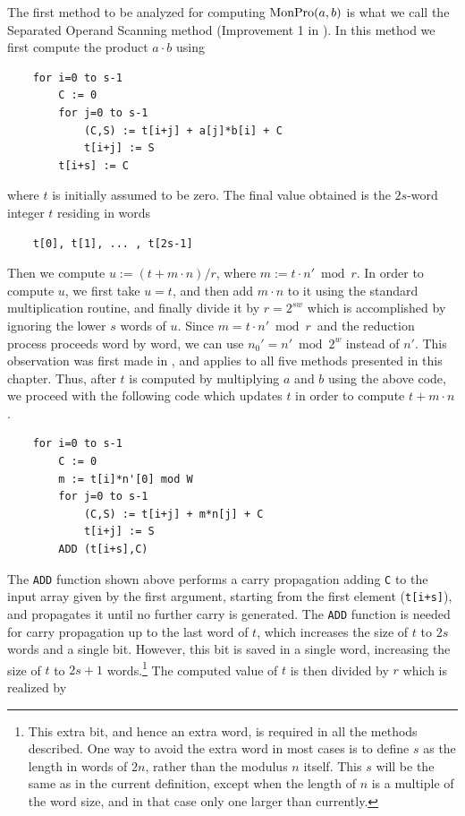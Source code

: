 \documentclass[twocolumn]{svjour3}          %
\begin{document}
The first method to be analyzed for computing $\mbox{MonPro}(a,b)$ is what we
call the Separated Operand Scanning method (Improvement 1 in
\cite{DK90:A}).  In this method we first compute the product $a \cdot
b$ using
%
\begin{verbatim}
    for i=0 to s-1
        C := 0
        for j=0 to s-1
            (C,S) := t[i+j] + a[j]*b[i] + C
            t[i+j] := S
        t[i+s] := C
\end{verbatim}
%
where $t$ is initially assumed to be zero.
The final value obtained is the $2s$-word integer $t$ residing
in words
%
\begin{verbatim}
    t[0], t[1], ... , t[2s-1]
\end{verbatim}
%
Then we compute $u:=(t+m \cdot n)/r$,
where $m:=t \cdot n' \bmod{r}$. In order to compute $u$, we
first take $u=t$, and then add $m \cdot n$ to it using the standard
multiplication routine, and finally divide it by $r=2^{sw}$ which is
accomplished by ignoring the lower $s$ words of $u$.
Since $m=t \cdot n' \bmod r\,$ and the reduction process proceeds word
by word, we can use $n_0'= n' \bmod{2^w}$ instead of $n'$. This
observation was first made in \cite{DK90:A}, and applies to all five
methods presented in this chapter.
Thus, after $t$ is computed by multiplying $a$ and $b$
using the above code, we proceed with the following code which
updates $t$ in order to compute $t+ m\cdot n$.
%
\begin{verbatim}
    for i=0 to s-1
        C := 0
        m := t[i]*n'[0] mod W
        for j=0 to s-1
            (C,S) := t[i+j] + m*n[j] + C
            t[i+j] := S
        ADD (t[i+s],C)
\end{verbatim}
%
The {\tt ADD} function shown above performs a carry propagation
adding {\tt C} to the input array given by the first argument,
starting from the first element ({\tt t[i+s]}), and propagates it
until no further carry is generated.
The {\tt ADD} function is needed for carry propagation up to the
last word of $t$, which increases the size of $t$ to $2s$ words
and a single bit. However, this bit is saved in a single word,
increasing the size of $t$ to $2s+1$ words.\footnote{
This extra
bit, and hence an extra word, is required in all the methods described.
One way to avoid the extra word in most cases
is to define $s$ as the length in words
of $2n$, rather than the modulus $n$ itself. This $s$ will
be the same as in the current definition, except when the length
of $n$ is a multiple of the word size, and in that case only
one larger than currently.}
The computed value of $t$ is then divided by $r$ which is realized by
\end{document}

